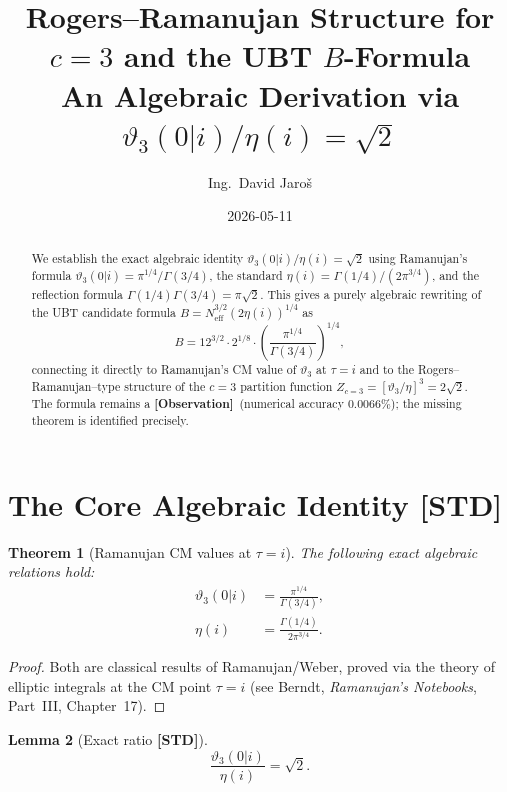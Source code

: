 \documentclass[12pt,a4paper]{article}
\title{\textbf{Rogers--Ramanujan Structure for $c=3$ and the UBT $B$-Formula}\\
{\large An Algebraic Derivation via $\vartheta_3(0|i)/\eta(i) = \sqrt{2}$}}
\author{Ing.\ David Jaro\v{s}}
\date{2026-05-11}
\newtheorem{theorem}{Theorem}[section]
\newtheorem{lemma}[theorem]{Lemma}
\theoremstyle{remark}
\newcommand{\STD}{\textbf{[STD]}}
\newcommand{\OBS}{\textbf{[Observation]}}
\begin{document}
\maketitle

\begin{abstract}
We establish the exact algebraic identity
$\vartheta_3(0|i)/\eta(i) = \sqrt{2}$
using Ramanujan's formula $\vartheta_3(0|i) = \pi^{1/4}/\Gamma(3/4)$,
the standard $\eta(i) = \Gamma(1/4)/(2\pi^{3/4})$,
and the reflection formula $\Gamma(1/4)\Gamma(3/4) = \pi\sqrt{2}$.
This gives a purely algebraic rewriting of the UBT candidate formula
$B = N_{\mathrm{eff}}^{3/2}(2\eta(i))^{1/4}$ as
\[
B = 12^{3/2}\cdot 2^{1/8}\cdot\left(\frac{\pi^{1/4}}{\Gamma(3/4)}\right)^{1/4},
\]
connecting it directly to Ramanujan's CM value of $\vartheta_3$ at $\tau=i$
and to the Rogers--Ramanujan--type structure of the $c=3$ partition function
$Z_{c=3} = [\vartheta_3/\eta]^3 = 2\sqrt{2}$.
The formula remains a \OBS\ (numerical accuracy $0.0066\%$);
the missing theorem is identified precisely.
\end{abstract}

\section{The Core Algebraic Identity \STD}
\label{sec:core}

\begin{theorem}[Ramanujan CM values at $\tau=i$]
\label{thm:ramanujan}
The following exact algebraic relations hold:
\begin{align}
  \vartheta_3(0|i) &= \frac{\pi^{1/4}}{\Gamma(3/4)},
  \label{eq:theta3i}\\
  \eta(i) &= \frac{\Gamma(1/4)}{2\pi^{3/4}}.
  \label{eq:etai}
\end{align}
\end{theorem}

\begin{proof}
Both are classical results of Ramanujan/Weber, proved via the
theory of elliptic integrals at the CM point $\tau=i$
(see Berndt, \emph{Ramanujan's Notebooks}, Part~III, Chapter~17).
\end{proof}

\begin{lemma}[Exact ratio \STD]
\label{lem:ratio}
\begin{equation}
  \frac{\vartheta_3(0|i)}{\eta(i)} = \sqrt{2}.
  \label{eq:ratio}
\end{equation}
\end{lemma}
\end{document}
